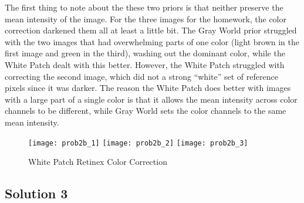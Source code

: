 \documentclass{article}
\newcommand{\solution}[1]{\clearpage \subsection*{Solution #1}}
\begin{document}
The first thing to note about the these two priors is that neither preserve the mean intensity of the image. For the three images for the homework, the color correction darkened them all at least a little bit. The Gray World prior struggled with the two images that had overwhelming parts of one color (light brown in the first image and green in the third), washing out the dominant color, while the White Patch dealt with this better. However, the White Patch struggled with correcting the second image, which did not a strong ``white'' set of reference pixels since it was darker. The reason the White Patch does better with images with a large part of a single color is that it allows the mean intensity across color channels to be different, while Gray World sets the color channels to the same mean intensity. 


\begin{figure*}[!h]
	\centering
	\texttt{[image: prob2b\_1]}
	\texttt{[image: prob2b\_2]}
	\texttt{[image: prob2b\_3]}
	\caption{White Patch Retinex Color Correction}
	\label{fig:p2b}
\end{figure*}

\solution{3}
\end{document}
